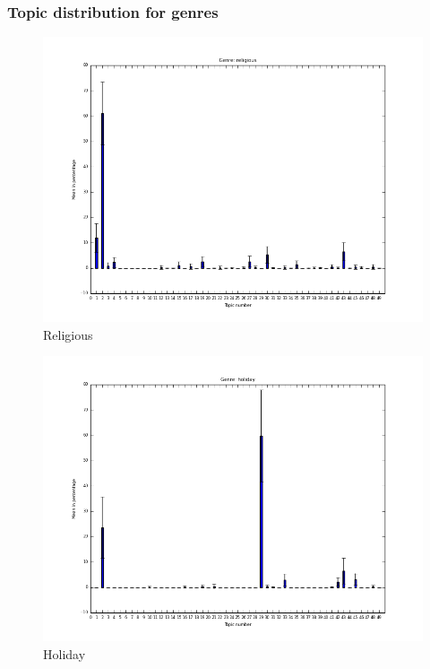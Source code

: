 \documentclass[t,ignorenonframetext]{beamer}
\begin{document}
\begin{frame}
\frametitle{Topic distribution for genres}

\begin{minipage}[b][.35\textheight][t]{.47\textwidth}
\begin{figure}
\includegraphics[scale=0.2]{bar_charts/religious}
\caption{Religious}
\end{figure}
\end{minipage}\hfill%
    \begin{minipage}[b][.35\textheight][t]{.47\textwidth}
    \begin{figure}
\includegraphics[scale=0.2]{bar_charts/holiday}
\caption{Holiday}
\end{figure}
\end{minipage}\\[2.1em]


\end{frame}
\end{document}
